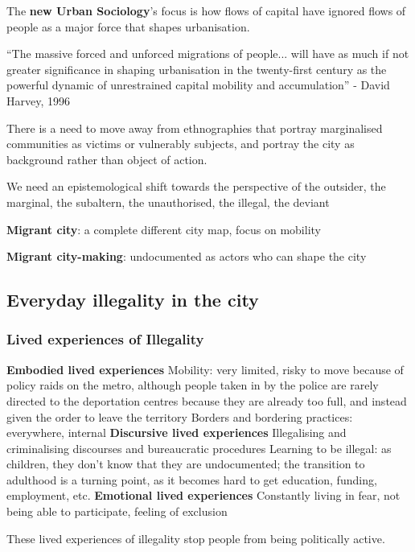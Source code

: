 \documentclass{article}
\begin{document}
The \textbf{new Urban Sociology}'s focus is how flows of capital have ignored flows of people as a major force that shapes urbanisation. 

``The massive forced and unforced migrations of people... will have as much if not greater significance in shaping urbanisation in the twenty-first century as the powerful dynamic of unrestrained capital mobility and accumulation'' - David Harvey, 1996

There is a need to move away from ethnographies that portray marginalised communities as victims or vulnerably subjects, and portray the city as background rather than object of action.

We need an epistemological shift towards the perspective of the outsider, the marginal, the subaltern, the unauthorised, the illegal, the deviant


\textbf{Migrant city}: a complete different city map, focus on mobility

\textbf{Migrant city-making}: undocumented as actors who can shape the city

\subsection{Everyday illegality in the city}

\subsubsection{Lived experiences of Illegality}

\begin{outline}
	\1 \textbf{Embodied lived experiences}
		\2 Mobility: very limited, risky to move because of policy raids on the metro, although people taken in by the police are rarely directed to the deportation centres because they are already too full, and instead given the order to leave the territory
		\2 Borders and bordering practices: everywhere, internal
	\1 \textbf{Discursive lived experiences}
		\2 Illegalising and criminalising discourses and bureaucratic procedures
		\2 Learning to be illegal: as children, they don't know that they are undocumented; the transition to adulthood is a turning point, as it becomes hard to get education, funding, employment, etc.
	\1 \textbf{Emotional lived experiences}
		\2 Constantly living in fear, not being able to participate, feeling of exclusion
\end{outline}

These lived experiences of illegality stop people from being politically active.
\end{document}
